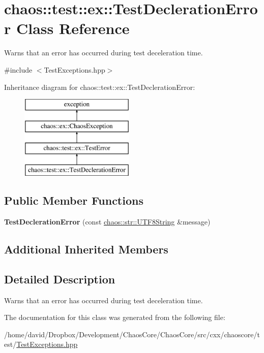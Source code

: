 \hypertarget{classchaos_1_1test_1_1ex_1_1_test_decleration_error}{\section{chaos\-:\-:test\-:\-:ex\-:\-:Test\-Decleration\-Error Class Reference}
\label{classchaos_1_1test_1_1ex_1_1_test_decleration_error}
}


Warns that an error has occurred during test deceleration time.  




{\ttfamily \#include $<$Test\-Exceptions.\-hpp$>$}

Inheritance diagram for chaos\-:\-:test\-:\-:ex\-:\-:Test\-Decleration\-Error\-:\begin{figure}[H]
\begin{center}
\leavevmode
\includegraphics[height=4.000000cm]{classchaos_1_1test_1_1ex_1_1_test_decleration_error}
\end{center}
\end{figure}
\subsection*{Public Member Functions}
\begin{DoxyCompactItemize}
\item 
\hypertarget{classchaos_1_1test_1_1ex_1_1_test_decleration_error_a8259da88aff708a3058913be4ea3bf3d}{{\bfseries Test\-Decleration\-Error} (const \hyperlink{classchaos_1_1str_1_1_u_t_f8_string}{chaos\-::str\-::\-U\-T\-F8\-String} \&message)}\label{classchaos_1_1test_1_1ex_1_1_test_decleration_error_a8259da88aff708a3058913be4ea3bf3d}

\end{DoxyCompactItemize}
\subsection*{Additional Inherited Members}


\subsection{Detailed Description}
Warns that an error has occurred during test deceleration time. 

The documentation for this class was generated from the following file\-:\begin{DoxyCompactItemize}
\item 
/home/david/\-Dropbox/\-Development/\-Chaos\-Core/\-Chaos\-Core/src/cxx/chaoscore/test/\hyperlink{_test_exceptions_8hpp}{Test\-Exceptions.\-hpp}\end{DoxyCompactItemize}
